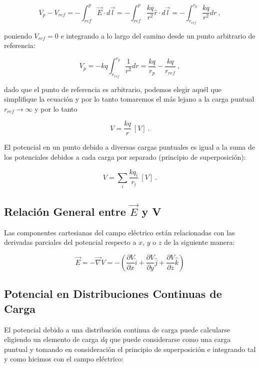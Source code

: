 \documentclass{tufte-handout}
\begin{document}
\begin{equation}
V_p - V_{ref} = -\int_{ref}^p \vec{E}\cdot d\vec{l} = -\int_{ref}^p \frac{kq}{r^2}\hat{r}\cdot d\vec{l} = -\int_{r_{ref}}^{r_p}\frac{kq}{r^2}dr~,
\end{equation}

poniendo $V_{ref} = 0$ e integrando a lo largo del camino desde un punto arbitrario de referencia:

\begin{equation}
V_p = -kq\int_{r_{ref}}^{r_p}\frac{1}{r^2}dr = \frac{kq}{r_p} - \frac{kq}{r_{ref}}~,
\end{equation}

dado que el punto de referencia es arbitrario, podemos elegir aquél que simplifique la ecuación y por lo tanto tomaremos el más lejano a la carga puntual $r_{ref} \rightarrow \infty$ y por lo tanto

\begin{equation}
V = \frac{kq}{r}~[V]~.
\end{equation}

El potencial en un punto debido a diversas cargas puntuales es igual a la suma de los potenciales debidos a cada carga por separado (principio de superposición):

\begin{equation}
V = \sum_i \frac{kq_i}{r_i}~[V]~.
\end{equation}

\subsection{Relación General entre $\vec{E}$ y V}

Las componentes cartesianas del campo eléctrico están relacionadas con las derivadas parciales del potencial respecto a $x$, $y$ o $z$ de la siguiente manera:

\begin{equation}
\vec{E} = -\vec{\nabla}V = -(\frac{\partial V}{\partial x}\hat{i} + \frac{\partial V}{\partial y}\hat{j} + \frac{\partial V}{\partial z}\hat{k})
\end{equation}

\subsection{Potencial en Distribuciones Continuas de Carga}

El potencial debido a una distribución continua de carga puede calcularse eligiendo un elemento de carga $dq$ que puede considerarse como una carga puntual y tomando en consideración el principio de superposición e integrando tal y como hicimos con el campo eléctrico: 
\end{document}
